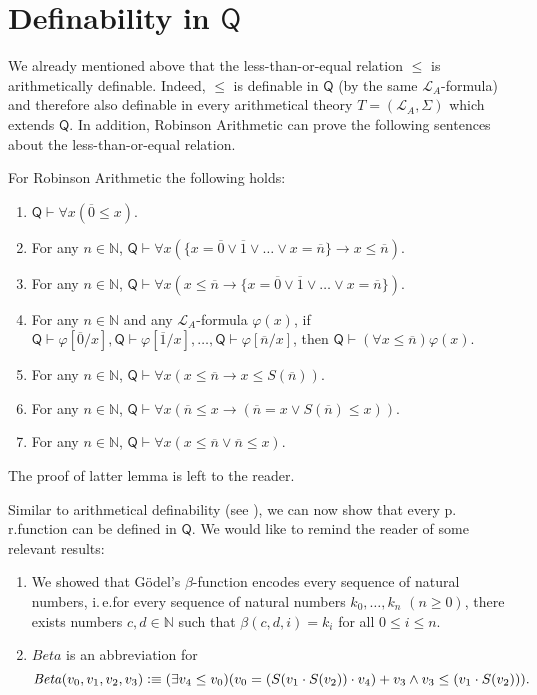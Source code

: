\section{Definability in $\mathsf{Q}$}
We already mentioned above that the less-than-or-equal relation $\le$ is arithmetically definable. Indeed, $\le$ is definable in $\mathsf{Q}$ (by the same $\mathcal{L}_A$-formula) and therefore also definable in every arithmetical theory $T= ( \mathcal{L}_A, \Sigma)$ which extends $\mathsf{Q}$. In addition, Robinson Arithmetic can prove the following sentences about the less-than-or-equal relation.
\begin{lem}\label{lem:ordnung}
For Robinson Arithmetic the following holds:
\begin{enumerate}[label=({O\arabic*})]
\item $\mathsf{Q} \vdash \forall x ( \overline{0} \le x)$.
\item For any $n\in \mathbb{N}$, $\mathsf{Q} \vdash \forall x ( \lbrace x = \overline{0} \vee \overline{1} \vee \ldots \vee x = \overline{n} \rbrace \rightarrow x \le \overline{n})$.
\item For any $n\in \mathbb{N}$, $\mathsf{Q} \vdash \forall x (x \le \overline{n} \rightarrow \lbrace x = \overline{0} \vee \overline{1} \vee \ldots \vee x = \overline{n} \rbrace )$.
\item For any $n\in \mathbb{N}$ and any $\mathcal{L}_A$-formula $\varphi(x)$, if $\mathsf{Q} \vdash \varphi[\overline{0}/x], \mathsf{Q} \vdash \varphi[\overline{1}/x], \ldots, \mathsf{Q} \vdash \varphi[\overline{n}/x]$, then $\mathsf{Q} \vdash (\forall x \le \overline{n}) \varphi(x)$.
\item For any $n\in \mathbb{N}$, $\mathsf{Q} \vdash \forall x (x \le \overline{n} \rightarrow x \le S(\overline{n}))$.
\item For any $n\in \mathbb{N}$, $\mathsf{Q} \vdash \forall x (\overline{n} \le x \rightarrow (\overline{n} = x \vee S(\overline{n}) \le x))$.
\item For any $n\in \mathbb{N}$, $\mathsf{Q} \vdash \forall x (x \le \overline{n} \vee \overline{n} \le x)$. 
\end{enumerate}
\end{lem}
The proof of latter lemma is left to the reader.


Similar to arithmetical definability (see ), we can now show that every p.\,r.\@ function can be defined in $\mathsf{Q}$. We would like to remind the reader of some relevant results:
\begin{enumerate}
\item We showed that G\"odel's $\beta$-function encodes every sequence of natural numbers, i.\,e.\@ for every sequence of natural numbers $k_0, \ldots, k_n$ $(n \ge 0)$, there exists numbers $c, d \in \mathbb{N}$ such that $\beta(c,d,i)=k_i$ for all $0 \le i \le n$.
\item $\mathit{Beta}$ is an abbreviation for \[ \mathit{Beta}(v_0,v_1,v_2,v_3)\vcentcolon \equiv ( \exists v_4 \le v_0 ) (v_0 = ( S(v_1 \cdot S(v_2)) \cdot v_4 ) + v_3 \wedge v_3 \le (v_1 \cdot S(v_2))).\] 
\end{enumerate} 


